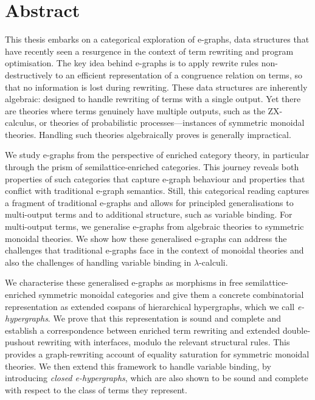 \chapter{Abstract}

This thesis embarks on a categorical exploration of e-graphs, data structures that have recently seen a resurgence in the context of term rewriting and program optimisation.
The key idea behind e-graphs is to apply rewrite rules non-destructively to an efficient representation of a congruence relation on terms, so that no information is lost during rewriting.
These data structures are inherently algebraic: designed to handle rewriting of terms with a single output.
Yet there are theories where terms genuinely have multiple outputs, such as the ZX-calculus, or theories of probabilistic processes---instances of symmetric monoidal theories.
Handling such theories algebraically proves is generally impractical.

We study e-graphs from the perspective of enriched category theory, in particular through the prism of semilattice-enriched categories.
This journey reveals both properties of such categories that capture e-graph behaviour and properties that conflict with traditional e-graph semantics.
Still, this categorical reading captures a fragment of traditional e-graphs and allows for principled generalisations to multi-output terms and to additional structure, such as variable binding.
For multi-output terms, we generalise e-graphs from algebraic theories to symmetric monoidal theories.
We show how these generalised e-graphs can address the challenges that traditional e-graphs face in the context of monoidal theories and also the challenges of handling variable binding in $\lambda$-calculi.

We characterise these generalised e-graphs as morphisms in free semilattice-enriched symmetric monoidal categories and give them a concrete combinatorial representation as extended cospans of hierarchical hypergraphs, which we call \emph{e-hypergraphs}.
We prove that this representation is sound and complete and establish a correspondence between enriched term rewriting and extended double-pushout rewriting with interfaces, modulo the relevant structural rules.
This provides a graph-rewriting account of equality saturation for symmetric monoidal theories.
We then extend this framework to handle variable binding, by introducing \emph{closed e-hypergraphs}, which are also shown to be sound and complete with respect to the class of terms they represent.


